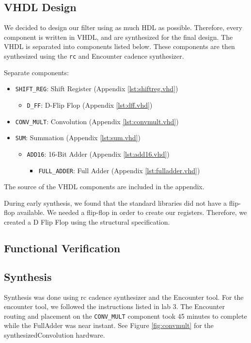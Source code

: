 \subsection{VHDL Design}
We decided to design our filter using as much HDL as possible.  Therefore, every component is written in VHDL, and are synthesized for the final design. The VHDL is separated into components listed below.  These components are then synthesized using the \texttt{rc} and Encounter cadence synthesizer.  

Separate components:
\begin{itemize}
\item \verb=SHIFT_REG=: Shift Register (Appendix \ref{lst:shiftreg.vhd})
	\begin{itemize}
		\item \verb=D_FF=: D-Flip Flop (Appendix \ref{lst:dff.vhd})
	\end{itemize}
\item \verb=CONV_MULT=: Convolution (Appendix \ref{lst:convmult.vhd})
\item \verb=SUM=: Summation (Appendix \ref{lst:sum.vhd})
	\begin{itemize}
		\item \verb=ADD16=: 16-Bit Adder (Appendix \ref{lst:add16.vhd})
		\begin{itemize}
			\item \verb=FULL_ADDER=: Full Adder (Appendix \ref{lst:fulladder.vhd})
		\end{itemize}
	\end{itemize}
\end{itemize}

The source of the VHDL components are included in the appendix.  

During early synthesis, we found that the standard libraries did not have a flip-flop available.  We needed a flip-flop in order to create our registers.  Therefore, we created a D Flip Flop using the structural specification.


\subsection{Functional Verification}



\subsection{Synthesis}

Synthesis was done using rc cadence synthesizer and the Encounter tool.  For the encounter tool, we followed the instructions listed in lab 3.  The Encounter routing and placement on the \verb=CONV_MULT= component took 45 minutes to complete while the FullAdder was near instant.  See Figure \ref{fig:convmult} for the synthesizedConvolution hardware.

